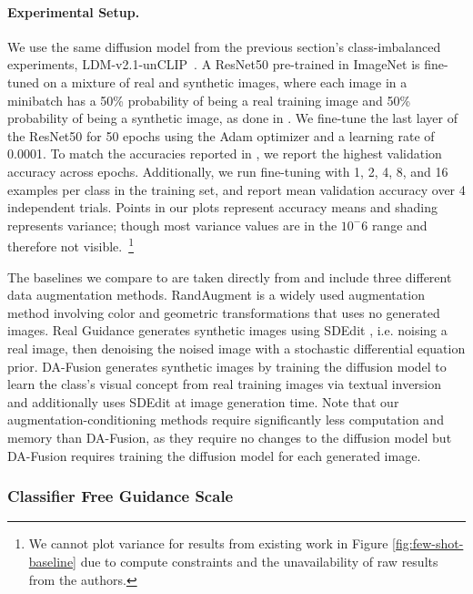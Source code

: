 \vspace{-0.2cm}
\paragraph{Experimental Setup.}
We use the same diffusion model from the previous section's class-imbalanced experiments, LDM-v2.1-unCLIP~\citep{stable_unclip}. 
A ResNet50 \citep{resnet50} pre-trained in ImageNet is fine-tuned on a mixture of real and synthetic images, where each image in a minibatch has a 50\% probability of being a real training image and 50\% probability of being a synthetic image, as done in \citep{da-fusion}. 
We fine-tune the last layer of the ResNet50 for 50 epochs using the Adam optimizer and a learning rate of 0.0001. 
To match the accuracies reported in \citep{da-fusion}, we report the highest validation accuracy across epochs. Additionally, we run fine-tuning with 1, 2, 4, 8, and 16 examples per class in the training set, and report mean validation accuracy over 4 independent trials. 
Points in our plots represent accuracy means and shading represents variance; though most variance values are in the $10^-6$ range and therefore not visible.~\footnote{We cannot plot variance for results from existing work in Figure \ref{fig:few-shot-baseline} due to compute constraints and the unavailability of raw results from the authors.}

The baselines we compare to are taken directly from \cite{da-fusion} and include three different data augmentation methods. RandAugment \citep{rand_aug} is a widely used augmentation method involving color and geometric transformations that uses no generated images. Real Guidance \citep{is_synthetic_data} generates synthetic images using SDEdit \citep{sdedit}, i.e. noising a real image, then denoising the noised image with a stochastic differential equation prior. DA-Fusion \citep{da-fusion} generates synthetic images by training the diffusion model to learn the class's visual concept from real training images via textual inversion \citep{text_inversion} and additionally uses SDEdit at image generation time. Note that our augmentation-conditioning methods require significantly less computation and memory than DA-Fusion, as they require no changes to the diffusion model but DA-Fusion requires training the diffusion model for each generated image.

\subsubsection{Classifier Free Guidance Scale}
\vspace{-0.15cm}

